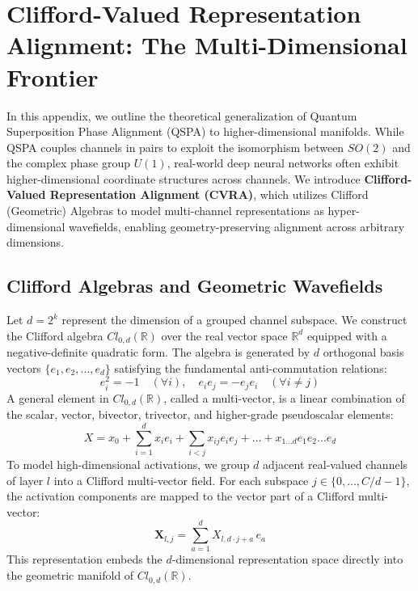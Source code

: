\documentclass{article}
\begin{document}
\section{Clifford-Valued Representation Alignment: The Multi-Dimensional Frontier}
\label{appendix:clifford}

In this appendix, we outline the theoretical generalization of Quantum Superposition Phase Alignment (QSPA) to higher-dimensional manifolds. While QSPA couples channels in pairs to exploit the isomorphism between $SO(2)$ and the complex phase group $U(1)$, real-world deep neural networks often exhibit higher-dimensional coordinate structures across channels. We introduce \textbf{Clifford-Valued Representation Alignment (CVRA)}, which utilizes Clifford (Geometric) Algebras to model multi-channel representations as hyper-dimensional wavefields, enabling geometry-preserving alignment across arbitrary dimensions.

\subsection{Clifford Algebras and Geometric Wavefields}
Let $d = 2^k$ represent the dimension of a grouped channel subspace. We construct the Clifford algebra $Cl_{0, d}(\mathbb{R})$ over the real vector space $\mathbb{R}^d$ equipped with a negative-definite quadratic form. The algebra is generated by $d$ orthogonal basis vectors $\{e_1, e_2, \dots, e_d\}$ satisfying the fundamental anti-commutation relations:
\begin{equation}
    e_i^2 = -1 \quad (\forall i), \quad e_i e_j = -e_j e_i \quad (\forall i \neq j)
\end{equation}
A general element in $Cl_{0, d}(\mathbb{R})$, called a multi-vector, is a linear combination of the scalar, vector, bivector, trivector, and higher-grade pseudoscalar elements:
\begin{equation}
    X = x_0 + \sum_{i=1}^d x_i e_i + \sum_{i < j} x_{ij} e_i e_j + \dots + x_{1 \dots d} e_1 e_2 \dots e_d
\end{equation}
To model high-dimensional activations, we group $d$ adjacent real-valued channels of layer $l$ into a Clifford multi-vector field. For each subspace $j \in \{0, \dots, C/d - 1\}$, the activation components are mapped to the vector part of a Clifford multi-vector:
\begin{equation}
    \mathbf{X}_{l, j} = \sum_{a=1}^d X_{l, d \cdot j + a} \, e_a
\end{equation}
This representation embeds the $d$-dimensional representation space directly into the geometric manifold of $Cl_{0, d}(\mathbb{R})$.
\end{document}
